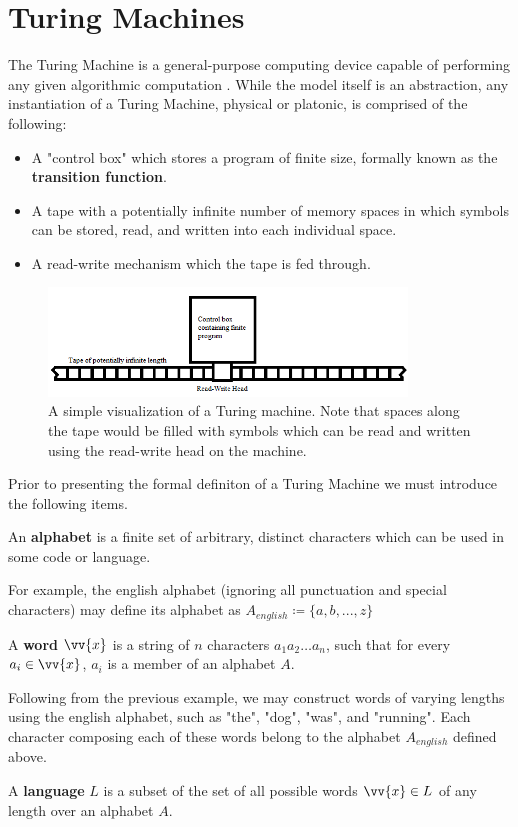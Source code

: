 \documentclass{article}
\begin{document}
\section{Turing Machines}
The Turing Machine is a general-purpose computing device capable of performing any given algorithmic computation \cite{1}.  While the model itself is an abstraction, any instantiation of a Turing Machine, physical or platonic, is comprised of the following:
\begin{itemize}
	\item A "control box" which stores a program of finite size, formally known as the \textbf{transition function}.
	\item A tape with a potentially infinite number of memory spaces in which symbols can be stored, read, and written into each individual space.
	\item A read-write mechanism which the tape is fed through. \cite{3}
\end{itemize}
\begin{figure}[h]
	\includegraphics[width=0.85\textwidth]{figure-3-1}
	\centering
	\setlength{\belowcaptionskip}{-10pt}
	\caption{A simple visualization of a Turing machine.  Note that spaces along the tape would be filled with symbols which can be read and written using the read-write head on the machine.}
\end{figure}

\noindent Prior to presenting the formal definiton of a Turing Machine we must introduce the following items.

\begin{defin}
	An \textbf{alphabet} is a finite set of arbitrary, distinct characters which can be used in some code or language.
\end{defin}
\noindent For example, the english alphabet (ignoring all punctuation and special characters) may define its alphabet as $A_{english} \coloneq \{ a, b, ... , z \}$
\begin{defin}
	A \textbf{word} $\vv{x}$ is a string of $n$ characters $a_{1}a_{2} \dots a_{n}$, such that for every $a_{i} \in \vv{x}$, $a_{i}$ is a member of an alphabet $A$.
\end{defin}
\noindent Following from the previous example, we may construct words of varying lengths using the english alphabet, such as "the", "dog", "was", and "running".  Each character composing each of these words belong to the alphabet $A_{english}$ defined above. \cite{4}
\begin{defin}
	A \textbf{language} $L$ is a subset of the set of all possible words $\vv{x} \in L$ of any length over an alphabet $A$.
\end{defin}
\end{document}
